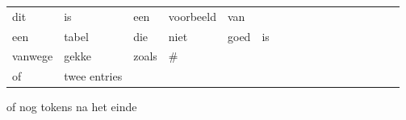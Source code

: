 
\begin{tabular}{lllllllllllllllll}
  dit & is & een & voorbeeld & van \\
  een & tabel & die & niet & goed & is \\
  vanwege & gekke & zoals & # & \\
  of & twee entries & \\
\end{tabular} of nog tokens na het einde

